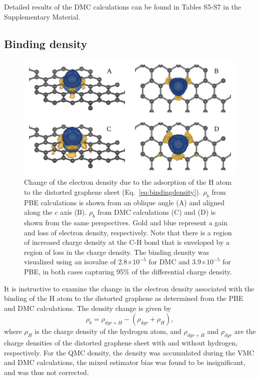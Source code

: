 Detailed results of the DMC calculations can be found in Tables S5-S7 in the Supplementary Material.

\subsection{Binding density}

\begin{figure}
    \centering
    \includegraphics[width=\textwidth,keepaspectratio]{Images/chapter4/hgraphene_minus_distgraphene_minusH_montage_labelled_lowres.png}
    \caption{Change of the electron density due to the adsorption of the H atom to the distorted graphene sheet (Eq.~\ref{eq:bindingdensity}). $\rho_b$ from PBE calculations is shown from an oblique angle (A) and aligned along the $c$ axis (B). $\rho_b$ from DMC calculations (C) and (D) is shown from the same perspectives. Gold and blue represent a gain and loss of electron density, respectively. Note that there is a region of increased charge density at the C-H bond that is enveloped by a region of loss in the charge density. The binding density was visualized using an isovalue of 2.8$\times10^{-5}$ for DMC and 3.9$\times10^{-5}$ for PBE, in both cases capturing 95\% of the differential charge density.}
    \label{fig:densdiff}
\end{figure}
It is instructive to examine the change in the electron density associated with the binding of the H atom to the distorted graphene as determined from the PBE and DMC calculations.
The density change is given by
\begin{equation}
\rho_b=\rho_{dgr+H}-(\rho_{dgr}+\rho_{H}),
\label{eq:bindingdensity}
\end{equation}
where $\rho_{H}$ is the charge density of the hydrogen atom, and $\rho_{dgr+H}$ and $\rho_{dgr}$ are the charge densities of the distorted graphene sheet with and without hydrogen, respectively. For the QMC density, the density was accumulated during the VMC and DMC calculations, the mixed estimator bias was found to be insignificant, and was thus not corrected.

